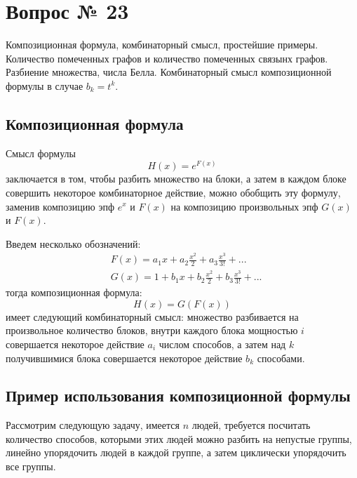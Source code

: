 \chapter{Вопрос № 23}

Композиционная формула, комбинаторный смысл, простейшие примеры. Количество помеченных графов и количество помеченных связынх графов. Разбиение множества, числа Белла. Комбинаторный смысл композиционной формулы в случае $b_k = t^k$.

\section{Композиционная формула}

Смысл формулы $$ H\left(x\right) = e^{F\left(x\right)} $$ заключается в том, чтобы разбить множество на блоки, а затем в каждом блоке совершить некоторое комбинаторное действие, можно обобщить эту формулу, заменив композицию эпф $e^x$ и $F\left(x\right)$ на композицию произвольных эпф $G\left(x\right)$ и $F\left(x\right)$.

Введем несколько обозначений:
\[
	\begin{split}
		& F\left(x\right) = a_1x + a_2\frac{x^2}{2} + a_3\frac{x^3}{3!} + ... \\
		& G\left(x\right) = 1 + b_1 x + b_2\frac{x^2}{2} + b_3\frac{x^3}{3!} + ...
	\end{split}
\]
тогда композиционная формула:
\begin{equation}
	H\left(x\right) = G\left(F\left(x\right)\right)
\end{equation}
имеет следующий комбинаторный смысл: множество разбивается на произвольное количество блоков, внутри каждого блока мощностью $i$ совершается некоторое действие $a_i$ числом способов, а затем над $k$ получившимися блока совершается некоторое действие $b_k$ способами.

\section{Пример использования композиционной формулы}

Рассмотрим следующую задачу, имеется $n$ людей, требуется посчитать количество способов, которыми этих людей можно разбить на непустые группы, линейно упорядочить людей в каждой группе, а затем циклически упорядочить все группы.

